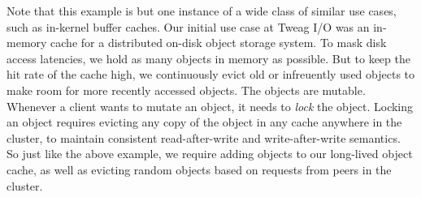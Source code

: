 \documentclass[11pt]{article}
\begin{document}
%
%

Note that this example is but one instance of a wide class of similar
use cases, such as in-kernel buffer caches. Our initial use case at
Tweag I/O was an in-memory cache for a distributed on-disk object
storage system. To mask disk access latencies, we hold as many objects
in memory as possible. But to keep the hit rate of the cache high, we
continuously evict old or infreuently used objects to make room for
more recently accessed objects. The objects are mutable. Whenever
a client wants to mutate an object, it needs to {\em lock} the object.
Locking an object requires evicting any copy of the object in any
cache anywhere in the cluster, to maintain consistent read-after-write
and write-after-write semantics. So just like the above example, we
require adding objects to our long-lived object cache, as well as
evicting random objects based on requests from peers in the cluster.
\end{document}
